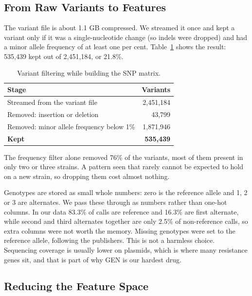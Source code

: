 \documentclass[conference]{IEEEtran}
\begin{document}
\subsection{From Raw Variants to Features}

The variant file is about 1.1 GB compressed. We streamed it once and kept a variant
only if it was a single-nucleotide change (so indels were dropped) and had a minor
allele frequency of at least one per cent. Table~\ref{tab:variants} shows the
result: 535{,}439 kept out of 2{,}451{,}184, or 21.8\%.

\begin{table}[t]
\caption{Variant filtering while building the SNP matrix.}
\label{tab:variants}
\centering
\small
\setlength{\tabcolsep}{4pt}
\renewcommand{\arraystretch}{1.15}
\begin{tabular}{|l|r|}
\hline
\rowcolor{headgrey}
\textbf{Stage} & \textbf{Variants} \\ \hline
Streamed from the variant file & 2{,}451{,}184 \\ \hline
Removed: insertion or deletion & 43{,}799 \\ \hline
Removed: minor allele frequency below 1\% & 1{,}871{,}946 \\ \hline
\rowcolor{oursblue}
\textbf{Kept} & \textbf{535{,}439} \\ \hline
\end{tabular}
\renewcommand{\arraystretch}{1.0}
\end{table}

The frequency filter alone removed 76\% of the variants, most of them present in
only two or three strains. A pattern seen that rarely cannot be expected to hold on
a new strain, so dropping them cost almost nothing.

Genotypes are stored as small whole numbers: zero is the reference allele and 1, 2
or 3 are alternates. We pass these through as numbers rather than one-hot columns.
In our data 83.3\% of calls are reference and 16.3\% are first alternate, while
second and third alternates together are only 2.5\% of non-reference calls, so extra
columns were not worth the memory. Missing genotypes were set to the reference
allele, following the publishers. This is not a harmless choice. Sequencing coverage
is usually lower on plasmids, which is where many resistance genes sit, and that is
part of why GEN is our hardest drug.

\subsection{Reducing the Feature Space}
\end{document}
